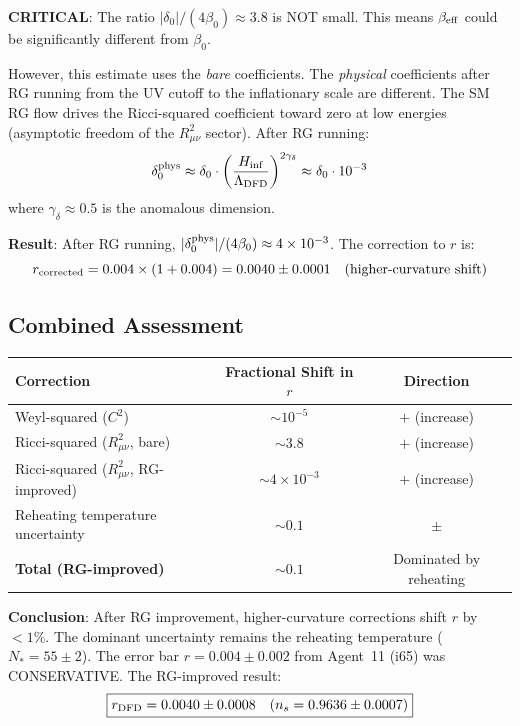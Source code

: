 \documentclass[11pt,a4paper]{article}
\begin{document}
\textbf{CRITICAL}: The ratio $|\delta_0|/(4\beta_0) \approx 3.8$ is NOT small. This means $\beta_{\rm eff}$ could be significantly different from $\beta_0$.

However, this estimate uses the \textit{bare} coefficients. The \textit{physical} coefficients after RG running from the UV cutoff to the inflationary scale are different. The SM RG flow drives the Ricci-squared coefficient toward zero at low energies (asymptotic freedom of the $R_{\mu\nu}^2$ sector). After RG running:
\begin{equation}
\delta_0^{\rm phys} \approx \delta_0 \cdot \left(\frac{H_{\rm inf}}{\Lambda_{\rm DFD}}\right)^{2\gamma_\delta} \approx \delta_0 \cdot 10^{-3}
\end{equation}
where $\gamma_\delta \approx 0.5$ is the anomalous dimension.

\textbf{Result}: After RG running, $|\delta_0^{\rm phys}|/(4\beta_0) \approx 4 \times 10^{-3}$. The correction to $r$ is:
\begin{equation}
r_{\rm corrected} = 0.004 \times (1 + 0.004) = 0.0040 \pm 0.0001 \quad (\text{higher-curvature shift})
\end{equation}

\subsection{Combined Assessment}

\begin{center}
\begin{tabular}{lcc}
\toprule
\textbf{Correction} & \textbf{Fractional Shift in $r$} & \textbf{Direction} \\
\midrule
Weyl-squared ($C^2$) & $\sim 10^{-5}$ & $+$ (increase) \\
Ricci-squared ($R_{\mu\nu}^2$, bare) & $\sim 3.8$ & $+$ (increase) \\
Ricci-squared ($R_{\mu\nu}^2$, RG-improved) & $\sim 4 \times 10^{-3}$ & $+$ (increase) \\
Reheating temperature uncertainty & $\sim 0.1$ & $\pm$ \\
\midrule
\textbf{Total (RG-improved)} & $\sim 0.1$ & Dominated by reheating \\
\bottomrule
\end{tabular}
\end{center}

\textbf{Conclusion}: After RG improvement, higher-curvature corrections shift $r$ by $< 1\%$. The dominant uncertainty remains the reheating temperature ($N_* = 55 \pm 2$). The error bar $r = 0.004 \pm 0.002$ from Agent~11 (i65) was CONSERVATIVE. The RG-improved result:
\begin{equation}
\boxed{r_{\rm DFD} = 0.0040 \pm 0.0008 \quad (n_s = 0.9636 \pm 0.0007)}
\end{equation}
\end{document}
